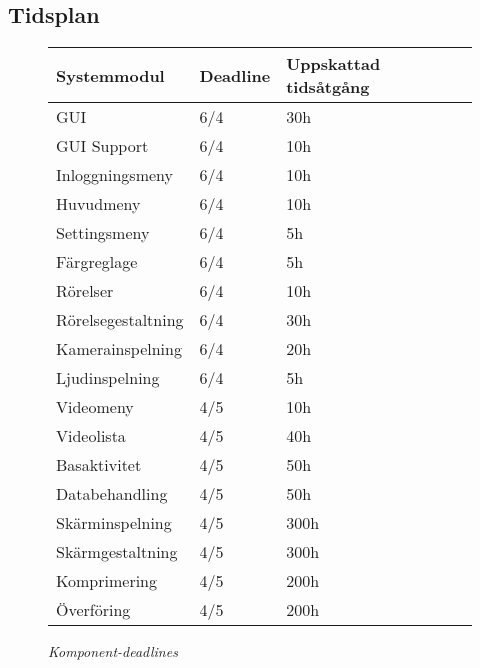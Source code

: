 \subsection{Tidsplan}
\begin{figure}[H]
\centering
\begin{tabular}{ | l | l | l |}
  \hline
  \textbf{Systemmodul} & \textbf{Deadline} & \textbf{Uppskattad tidsåtgång} \\ \hline
  GUI & 6/4 & 30h \\ \hline
  GUI Support & 6/4 & 10h \\ \hline
  Inloggningsmeny & 6/4 & 10h \\ \hline
  Huvudmeny & 6/4 & 10h \\ \hline
  Settingsmeny & 6/4 & 5h \\ \hline
  Färgreglage & 6/4 & 5h \\ \hline
  Rörelser & 6/4 & 10h \\ \hline
  Rörelsegestaltning & 6/4 & 30h \\ \hline
  Kamerainspelning & 6/4 & 20h \\ \hline
  Ljudinspelning & 6/4 & 5h \\ \hline
  Videomeny & 4/5 & 10h \\ \hline
  Videolista & 4/5 & 40h \\ \hline
  Basaktivitet & 4/5 & 50h \\ \hline
  Databehandling & 4/5 & 50h \\ \hline
  Skärminspelning & 4/5 & 300h  \\ \hline
  Skärmgestaltning & 4/5 & 300h \\ \hline
  Komprimering & 4/5 & 200h \\ \hline
  Överföring & 4/5 & 200h \\ \hline
\end{tabular}
\caption*{\textit{Komponent-deadlines}}
\end{figure}
